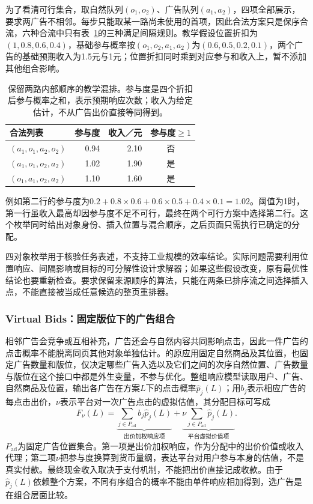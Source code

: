 为了看清可行集合，取自然队列$(o_1,o_2)$、广告队列$(a_1,a_2)$，四项全部展示，要求两广告不相邻。每步只能取某一路尚未使用的首项，因此合法方案只是保序合流，六种合流中只有表~\ref{tab:rs-merge-example}的三种满足间隔规则。教学假设位置折扣为$(1,0.8,0.6,0.4)$，基础参与概率按$(o_1,o_2,a_1,a_2)$为$(0.6,0.5,0.2,0.1)$，两个广告的基础预期收入为1.5元与1元；位置折扣同时乘到对应参与和收入上，暂不添加其他组合影响。

\begin{table}[htbp]
 \centering\small
 \begin{tabular}{@{}lrrc@{}}
  \toprule
  合法列表 & 参与度 & 收入／元 & 参与度$\geq1$\\
  \midrule
  $(a_1,o_1,a_2,o_2)$ & 0.94 & 2.10 & 否\\
  $(a_1,o_1,o_2,a_2)$ & 1.02 & 1.90 & 是\\
  $(o_1,a_1,o_2,a_2)$ & 1.10 & 1.60 & 是\\
  \bottomrule
 \end{tabular}
 \caption{保留两路内部顺序的教学混排。参与度是四个折扣后参与概率之和，表示预期响应次数；收入为给定估计，不从广告出价直接等同得到。}
 \label{tab:rs-merge-example}
\end{table}

例如第二行的参与度为$0.2+0.8\times0.6+0.6\times0.5+0.4\times0.1=1.02$。阈值为1时，第一行虽收入最高却因参与度不足不可行，最终在两个可行方案中选择第二行。这个枚举同时给出对象身份、插入位置与混合顺序，之后页面只需执行已确定的分配。

四对象枚举用于核验任务表述，不支持工业规模的效率结论。实际问题需要利用位置响应、间隔影响或目标的可分解性设计求解器；如果这些假设改变，原有最优性结论也要重新检查。要求保留来源顺序的算法，只能在两条已排序流之间选择插入点，不能直接被当成任意候选的整页重排器。

\subsubsection{Virtual Bids：固定版位下的广告组合}
\label{sec:rs-virtual-bids}

相邻广告会竞争或互相补充，广告还会与自然内容共同影响点击，因此一件广告的点击概率不能脱离同页其他对象单独估计。的原应用固定自然商品及其位置，也固定广告数量和版位，仅决定哪些广告入选以及它们之间的次序自然位置、广告数量与版位在这个接口中都是外生变量，不参与优化。整组响应模型读取用户、广告、自然商品及位置，输出各广告在方案$L$下的点击概率$\widehat p_j(L)$；用$b_j$表示相应广告的每点击出价，$\nu$表示平台对一次广告点击的虚拟估值，其分配目标可写成
\begin{equation}
 F_\nu(L)
 =\underbrace{\sum_{j\in P_{\mathrm{ad}}}b_j\widehat p_j(L)}
              _{\text{出价加权响应项}}
  +\underbrace{\nu\sum_{j\in P_{\mathrm{ad}}}\widehat p_j(L)}
              _{\text{平台虚拟价值项}}.
 \label{eq:rs-virtual-bids}
\end{equation}
$P_{\mathrm{ad}}$为固定广告位置集合。第一项是出价加权响应，作为分配中的出价价值或收入代理；第二项$\nu$把参与度换算到货币量纲，表达平台对用户参与本身的估值，不是真实付款。最终现金收入取决于支付机制，不能把出价直接记成收款。由于$\widehat p_j(L)$依赖整个方案，不同有序组合的概率不能由单件响应相加得到，选广告是在组合层面比较。

